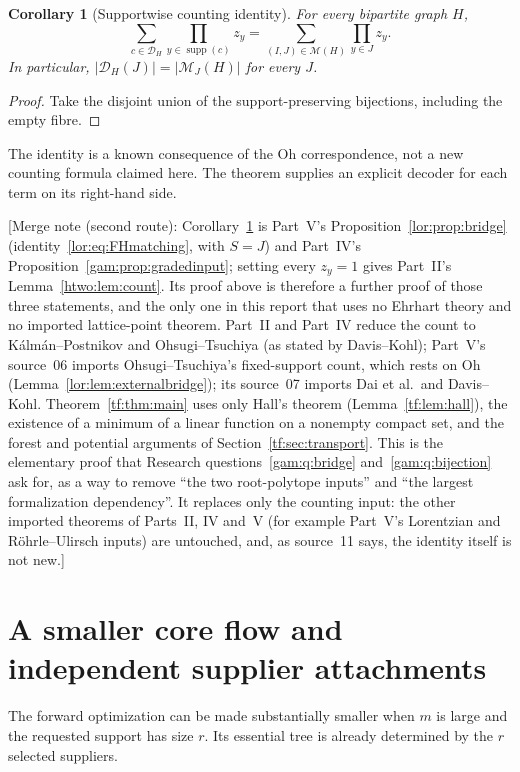 \documentclass[11pt]{article}
\numberwithin{equation}{section}
\newtheorem{corollary}[theorem]{Corollary}
\theoremstyle{definition}
\newcommand{\supp}{\operatorname{supp}}
\newcommand{\PM}{\mathcal M}
\newcommand{\cD}{\mathcal D}
\begin{document}
\begin{corollary}[Supportwise counting identity]
\label{tf:cor:count}
For every bipartite graph $H$,
\begin{equation}
 \sum_{c\in\cD_H}\prod_{y\in\supp(c)}z_y
 =\sum_{(I,J)\in\PM(H)}\prod_{y\in J}z_y.
 \label{tf:eq:supportidentity}
\end{equation}
In particular, $|\cD_H(J)|=|\PM_J(H)|$ for every $J$.
\end{corollary}
\begin{proof}
Take the disjoint union of the support-preserving bijections, including
the empty fibre.
\end{proof}
The identity is a known consequence of the Oh correspondence, not a new
counting formula claimed here. The theorem supplies an explicit decoder
for each term on its right-hand side.

[Merge note (second route): Corollary~\ref{tf:cor:count} is Part~V's
Proposition~\ref{lor:prop:bridge} (identity~\eqref{lor:eq:FHmatching},
with $S=J$) and Part~IV's Proposition~\ref{gam:prop:gradedinput}; setting
every $z_y=1$ gives Part~II's Lemma~\ref{htwo:lem:count}. Its proof above
is therefore a further proof of those three statements, and the only one
in this report that uses no Ehrhart theory and no imported lattice-point
theorem. Part~II and Part~IV reduce the count to K\'alm\'an--Postnikov and
Ohsugi--Tsuchiya (as stated by Davis--Kohl); Part~V's source~06 imports
Ohsugi--Tsuchiya's fixed-support count, which rests on Oh
(Lemma~\ref{lor:lem:externalbridge}); its source~07 imports Dai et al.\
and Davis--Kohl. Theorem~\ref{tf:thm:main} uses only Hall's theorem
(Lemma~\ref{tf:lem:hall}), the existence of a minimum of a linear function
on a nonempty compact set, and the forest and potential arguments of
Section~\ref{tf:sec:transport}. This is the elementary proof that
Research questions~\ref{gam:q:bridge} and~\ref{gam:q:bijection} ask for,
as a way to remove ``the two root-polytope inputs'' and ``the largest
formalization dependency''. It replaces only the counting input: the other
imported theorems of Parts~II, IV and~V (for example Part~V's Lorentzian
and R\"ohrle--Ulirsch inputs) are untouched, and, as source~11 says, the
identity itself is not new.]

\section{A smaller core flow and independent supplier attachments}
\label{tf:sec:core}
The forward optimization can be made substantially smaller when $m$ is
large and the requested support has size $r$. Its essential tree is
already determined by the $r$ selected suppliers.
\end{document}
